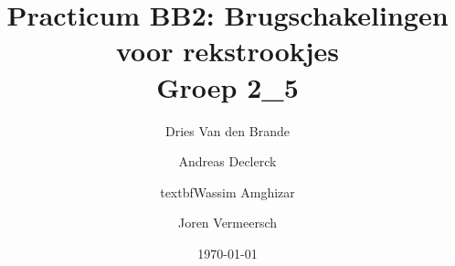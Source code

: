 \documentclass[12pt]{article}
\begin{document}
    \title{\textbf{Practicum BB2: Brugschakelingen voor rekstrookjes} \\\small{Groep 2\_5}}
    \author{Dries Van den Brande \and Andreas Declerck \and textbf{Wassim Amghizar} \and Joren Vermeersch}
    \date{\today}

    \maketitle


    

    

    

    

    

    

    

    
\end{document}
